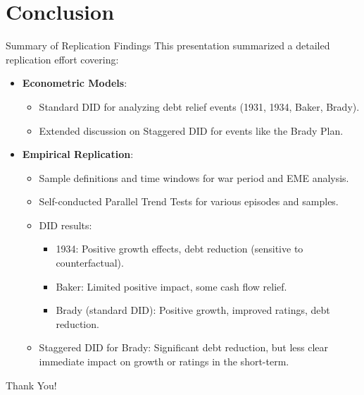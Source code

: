 \documentclass{beamer}
\begin{document}
\section{Conclusion}
\begin{frame}{Summary of Replication Findings}
  This presentation summarized a detailed replication effort covering:
  \begin{itemize}
    \item \textbf{Econometric Models}:
    \begin{itemize}
        \item Standard DID for analyzing debt relief events (1931, 1934, Baker, Brady).
        \item Extended discussion on Staggered DID for events like the Brady Plan.
    \end{itemize}
    \item \textbf{Empirical Replication}:
    \begin{itemize}
        \item Sample definitions and time windows for war period and EME analysis.
        \item Self-conducted Parallel Trend Tests for various episodes and samples.
        \item DID results:
            \begin{itemize}
                \item 1934: Positive growth effects, debt reduction (sensitive to counterfactual).
                \item Baker: Limited positive impact, some cash flow relief.
                \item Brady (standard DID): Positive growth, improved ratings, debt reduction.
            \end{itemize}
        \item Staggered DID for Brady: Significant debt reduction, but less clear immediate impact on growth or ratings in the short-term.
    \end{itemize}
  \end{itemize}
\end{frame}

\begin{frame}
  \centering
  \Huge Thank You! \par \bigskip
\end{frame}
\end{document}
